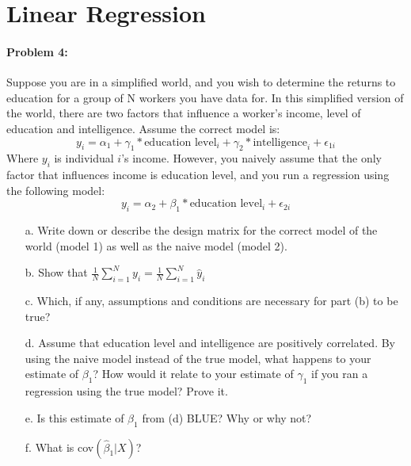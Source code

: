 \documentclass{article}
\begin{document}
\section*{Linear Regression}
\paragraph{Problem 4:}
Suppose you are in a simplified world, and you wish to determine the
returns to education for a group of N workers you have data for.  In
this simplified version of the world, there are two factors that
influence a worker's income, level of education and intelligence.
Assume the correct model is:
\begin{equation} y_{i} = \alpha_{1} + \gamma_{1}*\text{education level}_{i} + \gamma_{2}*\text{intelligence}_{i} + \epsilon_{1i} \end{equation}
Where $y_{i}$ is individual $i$'s income.  However, you naively assume that the only factor that influences income is education level, and you run a regression using the following model:
\begin{equation} y_{i} = \alpha_{2} + \beta_{1}*\text{education level}_{i} + \epsilon_{2i}  \end{equation}
\begin{itemize}

\item[a.] Write down or describe the design matrix for the correct model of the world (model 1) as well as the naive model (model 2).
\item[b.] Show that $\frac{1}{N}\sum_{i = 1}^N y_{i} = \frac{1}{N}\sum_{i = 1}^N \hat{y}_{i}$
\item[c.] Which, if any, assumptions and conditions are necessary for part (b) to be true?
\item[d.] Assume that education level and intelligence are positively correlated.  By using the naive model instead of the true model, what happens to your estimate of $\beta_{1}$?  How would it relate to your estimate of $\gamma_{1}$ if you ran a regression using the true model?  Prove it.
\item[e.] Is this estimate of $\beta_{1}$ from (d) BLUE?  Why or why
  not?
\item[f.]  What is cov$(\hat{\beta}_1|X)$? 
\end{itemize}

\end{document}
